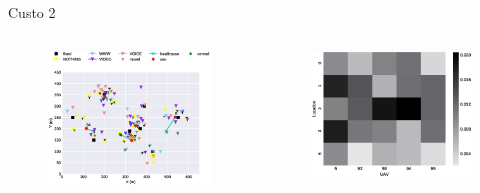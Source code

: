 \begin{frame}{Custo 2}
        \begin{columns}
            \begin{column}{0.65\textwidth}
               \begin{figure}[!htb]
                    \includegraphics[width=\textwidth]{custo_2/330_uav_loc.eps}
                \end{figure}
            \end{column}
            \begin{column}{0.45\textwidth}
               \begin{figure}[!htb]
                    \includegraphics[width=\textwidth]{custo_2/330_bij_.eps}

\end{figure}
\end{column}
\end{columns}
\end{frame}

